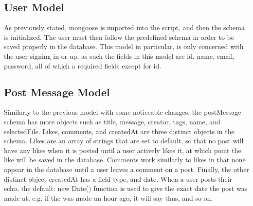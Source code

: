 \subsection{User Model}
As previously stated, mongoose is imported into the script, and then the schema is initialized. The user must then follow the predefined schema in order to be saved properly in the database. This model in particular, is only concerned with the user signing in or up, as such the fields in this model are id, name, email, password, all of which a required fields except for id.
\subsection{Post Message Model}
Similarly to the previous model with some noticeable changes, the postMessage schema has more objects such as title, message, creator, tags, name, and selectedFile. Likes, comments, and createdAt are three distinct objects in the schema. Likes are an array of strings that are set to default, so that no post will have any likes when it is posted until a user actively likes it, at which point the like will be saved in the database. Comments work similarly to likes in that none appear in the database until a user leaves a comment on a post. Finally, the other distinct object createdAt has a field type, and date. When a user posts their echo, the default: new Date() function is used to give the exact date the post was made at, e.g. if the was made an hour ago, it will say thus, and so on.


